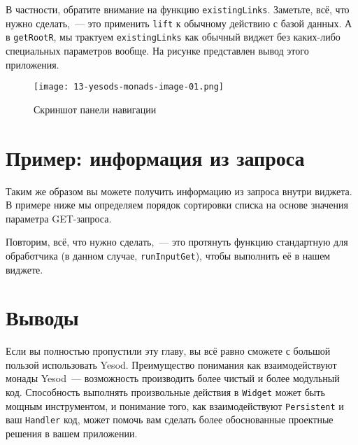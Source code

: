
В частности, обратите внимание на функцию \lstinline'existingLinks'. Заметьте,
всё, что нужно сделать,~--- это применить \lstinline'lift' к обычному действию с
базой данных. А в \lstinline'getRootR', мы трактуем \lstinline'existingLinks'
как обычный виджет без каких-либо специальных параметров вообще. На
рисунке представлен вывод этого приложения.

\begin{figure}[tbh]
  \centering
  \texttt{[image: 13-yesods-monads-image-01.png]}
  \caption{Скриншот панели навигации}
\end{figure}

\section{Пример: информация из запроса}
Таким же образом вы можете получить информацию из запроса внутри виджета. В
примере ниже мы определяем порядок сортировки списка на основе значения
параметра GET-запроса.


Повторим, всё, что нужно сделать,~--- это протянуть функцию стандартную для
обработчика (в данном случае, \lstinline'runInputGet'), чтобы выполнить её в
нашем виджете.

\section{Выводы}
Если вы полностью пропустили эту главу, вы всё равно сможете с большой пользой
использовать Yesod. Преимущество понимания как взаимодействуют монады
Yesod~--- возможность производить более чистый и более модульный код. Способность
выполнять произвольные действия в \lstinline'Widget' может быть мощным инструментом, и
понимание того, как взаимодействуют \lstinline'Persistent' и ваш \lstinline'Handler' код,
может помочь вам сделать более обоснованные проектные решения в вашем приложении.
